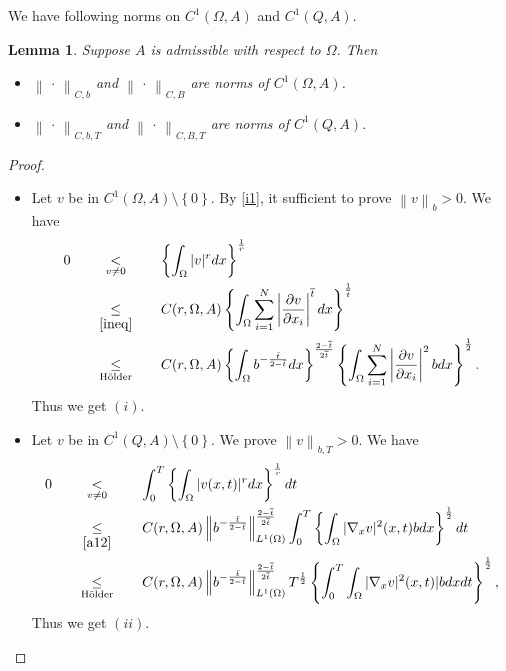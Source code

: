 \documentclass[11pt, a4paper]{article}
\newtheorem{lemma}[theorem]{Lemma}
\numberwithin{equation}{section}
\newcommand{\coex}[2][\hphantom{longexplanation}]{%
  \underset{{#1}}{\overset{\hphantom{longexplanation}}{#2}}
}
\newcommand{\abs}[1]{\left\lvert #1\right\rvert}
\newcommand{\norm}[1]{\left\lVert #1\right\rVert}
\begin{document}
 We have following norms on $C^{1}(\Omega,A)$ and $C^{1}(Q,A)$.
 \begin{lemma}
   \label{4l2}
   Suppose $A$ is admissible with respect to $\Omega$. Then
 \begin{itemize}[wide]
 \item[(i)] $\norm{\,\cdot\,}_{C,b}$ and $\norm{\,\cdot\,}_{C,B}$  are  norms of
   $C^{1}(\Omega,A)$.
 \item[(ii)] $\norm{\,\cdot\,}_{C,b,T}$ and $\norm{\,\cdot\,}_{C,B,T}$  are  norms of  $C^{1}(Q,A)$.
 \end{itemize}
  \end{lemma}
  \begin{proof}
    \begin{itemize}[wide]
    \item[$(i)$] Let $v$ be in $C^{1}(\Omega,A)\setminus \left\{0\right\}$. By \eqref{i1}, it sufficient to prove $\norm{v}_{b}>0$. We have
\begin{align}
    \label{a12}
    \begin{split}      0&\coex[v\not=0]{<}\left\{\int_{\Omega}|v|^{r}dx\right\}^{\frac{1}{r}}
      \\
      &\coex[\eqref{ineq}]{\le} C(r,\Omega,A)\left\{\int_{\Omega} \sum_{i=1}^{N} \abs{\frac{\partial v}{\partial x_i}}^{\overline{t}}dx\right\}^{\frac{1}{\overline{t}}} 
      \\
      &\coex[\text{H\"{o}lder}]{\le} C(r,\Omega,A)\left\{\int_{\Omega} b^{-\frac{\bar{t}}{2-\bar{t}}} dx\right\}^{\frac{2-\overline{t}}{2\overline{t}
      }}\left\{\int_{\Omega} \sum_{i=1}^{N} \abs{\frac{\partial v}{\partial x_i}}^{2}bdx\right\}^{\frac{1}{2}}.
    \end{split}
\end{align}
Thus we get $(i)$.
 
\item[$(ii)$] Let $v$ be in $C^{1}(Q,A)\setminus \left\{0\right\}$. We
  prove $\norm{v}_{b,T}>0$. We have
  \begin{align*} 0&\coex[v\not=0]{<}\int_{0}^{T}\left\{\int_{\Omega}|v(x,t)|^{r}dx\right\}^{\frac{1}{r}}dt\\
    &\coex[\eqref{a12}]{\le}
      C(r,\Omega,A)\norm{b^{-\frac{\bar{t}}{2-\bar{t}}}}_{L^{1}(\Omega)}^{\frac{2-\overline{t}}{2\overline{t}}}\int_{0}^{T}\left\{\int_{\Omega}
      |\nabla_{x} v|^{2}(x,t)bdx\right\}^{\frac{1}{2}}dt\\
                  &\coex[\text{H\"{o}lder}]{\le} C(r,\Omega,A)\norm{b^{-\frac{\bar{t}}{2-\bar{t}}}}_{L^{1}(\Omega)}^{\frac{2-\overline{t}}{2\overline{t}}}T^{\frac{1}{2}}\left\{\int_{0}^{T}\int_{\Omega} |\nabla_{x} v|^{2}(x,t)|bdxdt\right\}^{\frac{1}{2}},
  \end{align*}
Thus we get $(ii)$.
\end{itemize}
\end{proof}
\end{document}
